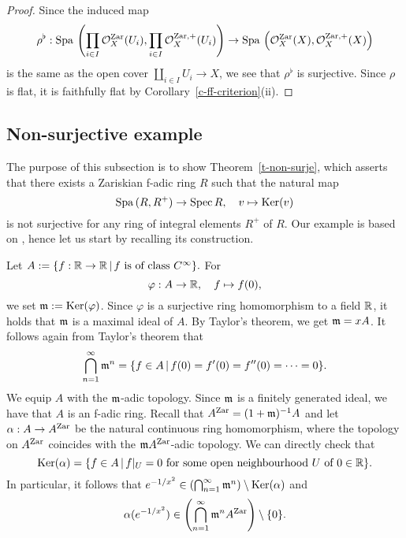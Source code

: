 \begin{proof}
Since the induced map 
$$\rho^{\flat}:
{\operatorname{Spa}}\,\left(\prod_{i \in I}\mathcal{O}_X^{{\operatorname{Zar}}}(U_i), \prod_{i \in I}\mathcal{O}_X^{{\operatorname{Zar}}, +}(U_i)\right)
\to 
{\operatorname{Spa}}\,\left(\mathcal{O}_X^{{\operatorname{Zar}}}(X), \mathcal{O}_X^{{\operatorname{Zar}}, +}(X)\right)$$
is the same as the open cover $\coprod_{i \in I} U_i \to X$, 
we see that $\rho^{\flat}$ is surjective. 
Since $\rho$ is flat, it is faithfully flat by Corollary~\ref{c-ff-criterion}(ii). 
\end{proof}

\subsection{Non-surjective example}\label{ss-non-surje}

The purpose of this subsection is 
to show Theorem~\ref{t-non-surje}, 
which asserts that there exists a Zariskian f-adic ring $R$ such that 
the natural map 
$${\operatorname{Spa}}\,(R, R^+) \to {\operatorname{Spec}}\,R,\quad v \mapsto {\operatorname{Ker}}(v)$$
is not surjective for any ring of integral elements $R^+$ of $R$. 
Our example is based on \cite[Remark (2) after Theorem 10.17]{AM69}, 
hence let us start by recalling its construction. 



\begin{nota}\label{n-AM}
Let $A:=\{f:\mathbb{R} \to \mathbb{R}\,|\,f\text{ is of class }C^{\infty}\}.$ 
For 
$$\varphi:A \to \mathbb{R},\quad f \mapsto f(0),$$
we set $\mathfrak{m}:={\operatorname{Ker}}(\varphi)$. 
Since $\varphi$ is a surjective ring homomorphism to a field $\mathbb{R}$, 
it holds that $\mathfrak{m}$ is a maximal ideal of $A$. 
By Taylor's theorem, we get $\mathfrak{m}=xA$. 
It follows again from Taylor's theorem that 
$$\bigcap_{n=1}^{\infty} \mathfrak{m}^n=\{f \in A\,|\,f(0)=f'(0)=f''(0)=\cdots=0\}.$$
We equip $A$ with the $\mathfrak{m}$-adic topology. 
Since $\mathfrak{m}$ is a finitely generated ideal, we have that $A$ is an f-adic ring. 
Recall that $A^{{\operatorname{Zar}}}=(1+\mathfrak{m})^{-1}A$ and 
let $\alpha:A \to A^{{\operatorname{Zar}}}$ be the natural continuous ring homomorphism, 
where the topology on $A^{{\operatorname{Zar}}}$ coincides with the $\mathfrak{m} A^{{\operatorname{Zar}}}$-adic topology. 
We can directly check that 
$${\operatorname{Ker}}(\alpha)=\{f \in A\,|\, f|_U=0\text{ for some open neighbourhood } U\text{ of } 0 \in \mathbb{R}\}.$$
In particular, it follows that 
$e^{-1/x^2} \in \left(\bigcap_{n=1}^{\infty} \mathfrak{m}^n\right) \setminus {\operatorname{Ker}}(\alpha)$ 
and 
$$\alpha(e^{-1/x^2}) \in \left(\bigcap_{n=1}^{\infty} \mathfrak{m}^n A^{{\operatorname{Zar}}}\right) \setminus \{0\}.$$
\end{nota}




